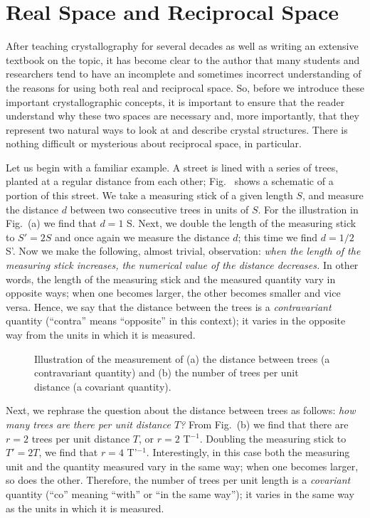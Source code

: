 \section{Real Space and Reciprocal Space}
After teaching crystallography for several decades as well as writing an extensive textbook on the topic, it has become clear to the author that many students and researchers tend to have an incomplete and sometimes incorrect understanding of the reasons for using both real and reciprocal space.  So, before we introduce these important crystallographic concepts, it is important to ensure that the reader understand why these two spaces are necessary and, more importantly, that they represent two natural ways to look at and describe crystal structures.  There is nothing difficult or mysterious about reciprocal space, in particular.

Let us begin with a familiar example.  A street is lined with a series of trees, planted at a regular distance from each other;  Fig.~ shows a schematic of a portion of this street.  We take a measuring stick of a given length $S$, and measure the distance $d$ between two consecutive trees in units of $S$.  For the illustration in Fig.~(a) we find that $d=1$ S.  Next, we double the length of the measuring stick to $S'=2S$ and once again we measure the distance $d$; this time we find $d = 1/2$ S'.  Now we make the following, almost trivial, observation: \textit{when the length of the measuring stick increases, the numerical value of the distance decreases.} In other words, the length of the measuring stick and the measured quantity vary in opposite ways; when one becomes larger, the other becomes smaller and vice versa.  Hence, we say that the distance between the trees is a \textit{contravariant} quantity (``contra'' means ``opposite'' in this context); it varies in the opposite way from the units in which it is measured.

\begin{wrapfigure}{r}{0.3\textwidth}
  \centering\leavevmode
\caption{\small Illustration of the measurement of (a) the distance between trees (a contravariant quantity) and (b) the number of trees per unit distance (a covariant quantity).}
\end{wrapfigure}

Next, we rephrase the question about the distance between trees as follows: \textit{how many trees are there per unit distance $T$?}  From Fig.~(b) we find that there are $r=2$ trees per unit distance $T$, or $r=2$ T$^{-1}$.  Doubling the measuring stick to $T'=2T$, we find that $r=4$ T'$^{-1}$.  Interestingly, in this case both the measuring unit and the quantity measured vary in the same way; when one becomes larger, so does the other.  Therefore, the number of trees per unit length is a \textit{covariant} quantity (``co'' meaning ``with'' or ``in the same way''); it varies in the same way as the units in which it is measured.


